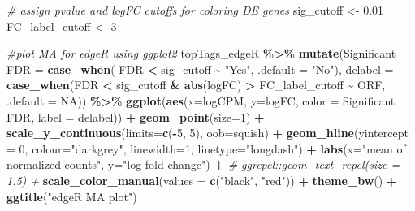 \documentclass[
]{book}
\newenvironment{Shaded}{\begin{snugshade}}{\end{snugshade}}
\newcommand{\AttributeTok}[1]{\textcolor[rgb]{0.13,0.29,0.53}{#1}}
\newcommand{\CommentTok}[1]{\textcolor[rgb]{0.56,0.35,0.01}{\textit{#1}}}
\newcommand{\ConstantTok}[1]{\textcolor[rgb]{0.56,0.35,0.01}{#1}}
\newcommand{\DecValTok}[1]{\textcolor[rgb]{0.00,0.00,0.81}{#1}}
\newcommand{\FloatTok}[1]{\textcolor[rgb]{0.00,0.00,0.81}{#1}}
\newcommand{\FunctionTok}[1]{\textcolor[rgb]{0.13,0.29,0.53}{\textbf{#1}}}
\newcommand{\NormalTok}[1]{#1}
\newcommand{\OtherTok}[1]{\textcolor[rgb]{0.56,0.35,0.01}{#1}}
\newcommand{\SpecialCharTok}[1]{\textcolor[rgb]{0.81,0.36,0.00}{\textbf{#1}}}
\newcommand{\StringTok}[1]{\textcolor[rgb]{0.31,0.60,0.02}{#1}}
\begin{document}
\begin{Shaded}
\begin{Highlighting}[]
\CommentTok{\# assign pvalue and logFC cutoffs for coloring DE genes}
\NormalTok{sig\_cutoff }\OtherTok{\textless{}{-}} \FloatTok{0.01}
\NormalTok{FC\_label\_cutoff }\OtherTok{\textless{}{-}} \DecValTok{3}

\CommentTok{\#plot MA for edgeR using ggplot2}
\NormalTok{topTags\_edgeR }\SpecialCharTok{\%\textgreater{}\%}
  \FunctionTok{mutate}\NormalTok{(}\StringTok{\textasciigrave{}}\AttributeTok{Significant FDR}\StringTok{\textasciigrave{}} \OtherTok{=} \FunctionTok{case\_when}\NormalTok{(}
\NormalTok{        FDR }\SpecialCharTok{\textless{}}\NormalTok{ sig\_cutoff }\SpecialCharTok{\textasciitilde{}} \StringTok{"Yes"}\NormalTok{,}
        \AttributeTok{.default =} \StringTok{"No"}\NormalTok{),}
        \AttributeTok{delabel =} \FunctionTok{case\_when}\NormalTok{(FDR }\SpecialCharTok{\textless{}}\NormalTok{ sig\_cutoff }\SpecialCharTok{\&} \FunctionTok{abs}\NormalTok{(logFC) }\SpecialCharTok{\textgreater{}}\NormalTok{ FC\_label\_cutoff }\SpecialCharTok{\textasciitilde{}}\NormalTok{ ORF,}
                             \AttributeTok{.default =} \ConstantTok{NA}\NormalTok{)) }\SpecialCharTok{\%\textgreater{}\%}
  \FunctionTok{ggplot}\NormalTok{(}\FunctionTok{aes}\NormalTok{(}\AttributeTok{x=}\NormalTok{logCPM, }\AttributeTok{y=}\NormalTok{logFC, }\AttributeTok{color =} \StringTok{\textasciigrave{}}\AttributeTok{Significant FDR}\StringTok{\textasciigrave{}}\NormalTok{, }\AttributeTok{label =}\NormalTok{ delabel)) }\SpecialCharTok{+} 
    \FunctionTok{geom\_point}\NormalTok{(}\AttributeTok{size=}\DecValTok{1}\NormalTok{) }\SpecialCharTok{+} 
    \FunctionTok{scale\_y\_continuous}\NormalTok{(}\AttributeTok{limits=}\FunctionTok{c}\NormalTok{(}\SpecialCharTok{{-}}\DecValTok{5}\NormalTok{, }\DecValTok{5}\NormalTok{), }\AttributeTok{oob=}\NormalTok{squish) }\SpecialCharTok{+} 
    \FunctionTok{geom\_hline}\NormalTok{(}\AttributeTok{yintercept =} \DecValTok{0}\NormalTok{, }\AttributeTok{colour=}\StringTok{"darkgrey"}\NormalTok{, }\AttributeTok{linewidth=}\DecValTok{1}\NormalTok{, }\AttributeTok{linetype=}\StringTok{"longdash"}\NormalTok{) }\SpecialCharTok{+}
    \FunctionTok{labs}\NormalTok{(}\AttributeTok{x=}\StringTok{"mean of normalized counts"}\NormalTok{, }\AttributeTok{y=}\StringTok{"log fold change"}\NormalTok{) }\SpecialCharTok{+}
    \CommentTok{\# ggrepel::geom\_text\_repel(size = 1.5) +}
    \FunctionTok{scale\_color\_manual}\NormalTok{(}\AttributeTok{values =} \FunctionTok{c}\NormalTok{(}\StringTok{"black"}\NormalTok{, }\StringTok{"red"}\NormalTok{)) }\SpecialCharTok{+}
    \FunctionTok{theme\_bw}\NormalTok{() }\SpecialCharTok{+} 
    \FunctionTok{ggtitle}\NormalTok{(}\StringTok{"edgeR MA plot"}\NormalTok{)}


\end{Highlighting}
\end{Shaded}
\end{document}
